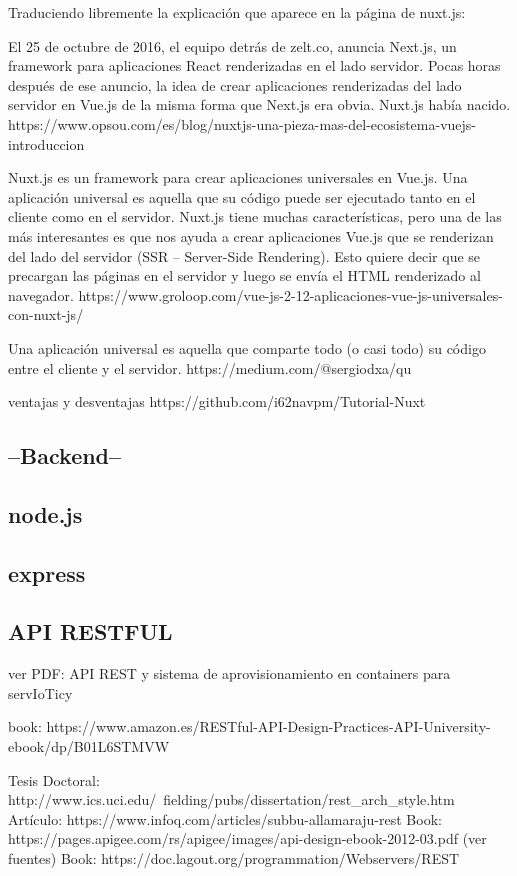 Traduciendo libremente la explicación que aparece en la página de nuxt.js:

    El 25 de octubre de 2016, el equipo detrás de zelt.co, anuncia Next.js, un framework para aplicaciones React renderizadas en el lado servidor. Pocas horas después de ese anuncio, la idea de crear aplicaciones renderizadas del lado servidor en Vue.js de la misma forma que Next.js era obvia. Nuxt.js había nacido.
https://www.opsou.com/es/blog/nuxtjs-una-pieza-mas-del-ecosistema-vuejs-introduccion


Nuxt.js es un framework para crear aplicaciones universales en Vue.js. Una aplicación universal es aquella que su código puede ser ejecutado tanto en el cliente como en el servidor. Nuxt.js tiene muchas características, pero una de las más interesantes es que nos ayuda a crear aplicaciones Vue.js que se renderizan del lado del servidor (SSR – Server-Side Rendering). Esto quiere decir que se precargan las páginas en el servidor y luego se envía el HTML renderizado al navegador.
https://www.groloop.com/vue-js-2-12-aplicaciones-vue-js-universales-con-nuxt-js/

Una aplicación universal es aquella que comparte todo (o casi todo) su código entre el cliente y el servidor.
https://medium.com/@sergiodxa/qu%

ventajas y desventajas
https://github.com/i62navpm/Tutorial-Nuxt

\subsection{--Backend--}
\subsection{node.js}
\subsection{express}
\subsection{API RESTFUL}
ver PDF: API REST y sistema de aprovisionamiento en containers para servIoTicy

book: https://www.amazon.es/RESTful-API-Design-Practices-API-University-ebook/dp/B01L6STMVW

Tesis Doctoral: http://www.ics.uci.edu/~fielding/pubs/dissertation/rest_arch_style.htm
Artículo: https://www.infoq.com/articles/subbu-allamaraju-rest
Book: https://pages.apigee.com/rs/apigee/images/api-design-ebook-2012-03.pdf (ver fuentes)
Book: https://doc.lagout.org/programmation/Webservers/REST%


